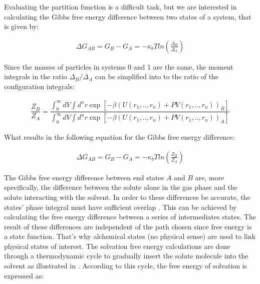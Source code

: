 Evaluating the partition function is a difficult task, but we are interested in calculating the Gibbs free energy difference between two states of a system, that is given by: 

\begin{equation}
\label{eq:dif}
\begin{aligned}
\Delta G_{AB} = G_{B} - G_{A}= -\kappa_{b}T ln \left( \frac{\Delta_{B}}{\Delta_{A}}\right) 
\end{aligned}
\end{equation}

Since the masses of particles in systems 0 and 1 are the same, the moment integrals in the ratio ${\Delta_{B}}/{\Delta_{A}}$ can be simplified into to the ratio of the configuration integrals:

\begin{equation}
\label{eq:partiso}
\begin{aligned}
\dfrac{Z_{B}}{Z_{A}} = \dfrac{\int_{0}^{\infty} dV \int d^{n}r \exp \left[ -\beta \left(U(r_{1},..,r_{n}) + PV(r_{1},..,r_{n}) \right)_{B} \right]}{\int_{0}^{\infty} dV \int d^{n}r \exp \left[ -\beta \left(U(r_{1},..,r_{n}) + PV(r_{1},..,r_{n}) \right)_{A} \right]}
\end{aligned}
\end{equation}

What results in the following equation for the Gibbs free energy difference:

\begin{equation}
\label{eq:dif}
\begin{aligned}
\Delta G_{AB} = G_{B} - G_{A}= -\kappa_{b}T ln \left( \frac{Z_{B}}{Z_{A}}\right)
\end{aligned}
\end{equation}

The Gibbs free energy difference between end states $A$ and $B$ are, more specifically, the difference between the solute alone in the gas phase and the solute interacting with the solvent. In order to these differences be accurate, the states' phase integral must have sufficient overlap  \cite{klimovich}. This can be achieved by calculating the free energy difference between a series of intermediates states. The result of these differences are independent of the path chosen since free energy is a state function. That's why alchemical states (no physical sense) are used to link physical states of interest. The solvation free energy calculations are done through a thermodynamic cycle to gradually insert the solute molecule into the solvent as illustrated in . According to this cycle, the free energy of solvation is expressed as:

